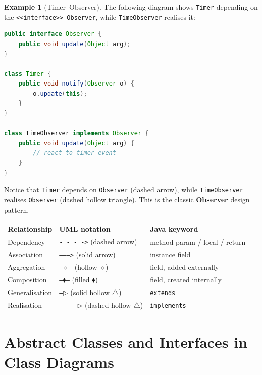 \documentclass[11pt, a4paper, notitlepage]{report}
\theoremstyle{definition}
\theoremstyle{remark}
\theoremstyle{definition}
\newtheorem{example}[theorem]{Example}
\begin{document}
\begin{example}[Timer--Observer]
\label{ex:ch6-timer-observer}
The following diagram shows \texttt{Timer} depending on the
\texttt{<<interface>> Observer}, while \texttt{TimeObserver} realises it:

\begin{lstlisting}[language=Java]
public interface Observer {
    public void update(Object arg);
}

class Timer {
    public void notify(Observer o) {
        o.update(this);
    }
}

class TimeObserver implements Observer {
    public void update(Object arg) {
        // react to timer event
    }
}
\end{lstlisting}

Notice that \texttt{Timer} depends on \texttt{Observer} (dashed arrow),
while \texttt{TimeObserver} realises \texttt{Observer} (dashed hollow
triangle).  This is the classic \textbf{Observer} design pattern.
\end{example}

\begin{keyresult}[title={Key Result: Relationship Summary}]
  \begin{tabular}{@{}lll@{}}
    \toprule
    Relationship & UML notation & Java keyword \\
    \midrule
    Dependency       & \texttt{- - - ->} (dashed arrow)       & method param / local / return \\
    Association      & \texttt{-------->} (solid arrow)        & instance field \\
    Aggregation      & \texttt{---$\diamond$---} (hollow $\diamond$) & field, added externally \\
    Composition      & \texttt{---$\blacklozenge$---} (filled $\blacklozenge$) & field, created internally \\
    Generalisation   & \texttt{---$\triangleright$} (solid hollow $\triangle$) & \texttt{extends} \\
    Realisation      & \texttt{- - -$\triangleright$} (dashed hollow $\triangle$) & \texttt{implements} \\
    \bottomrule
  \end{tabular}
\end{keyresult}

\section{Abstract Classes and Interfaces in Class Diagrams}
\label{sec:ch6-abstract}
\end{document}

